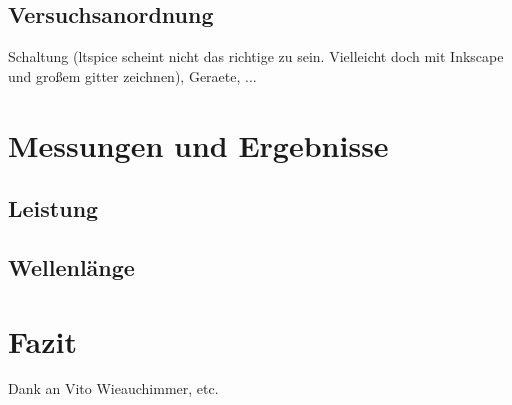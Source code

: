 \documentclass[11pt]{scrartcl}
\begin{document}
\subsection{Versuchsanordnung}
Schaltung (ltspice scheint nicht das richtige zu sein. Vielleicht doch mit Inkscape und großem gitter zeichnen),
Geraete, ...
\section{Messungen und Ergebnisse}
\subsection{Leistung}
\subsection{Wellenl\"ange}
\section{Fazit}
Dank an Vito Wieauchimmer, etc.
\end{document}
